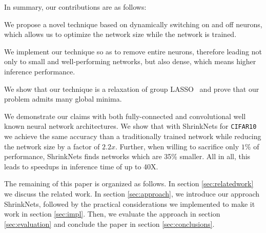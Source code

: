 In summary, our contributions are as follows: 

\begin{compactenum}

\item We propose a novel technique based on dynamically switching on and off neurons, 
which allows us to optimize the network size while the network is trained. 

\item We implement our technique so as to remove entire neurons, therefore
leading not only to small and well-performing networks, but also dense, which
means higher inference performance.


\item We show that our technique is a relaxation of group LASSO~\cite{Yuan2006}
and prove that our problem admits many global minima.

\item We demonstrate our claims with both fully-connected and convolutional well
known neural network architectures. We show that with ShrinkNets for
\texttt{CIFAR10} we achieve the same accuracy than a traditionally trained
network while reducing the network size by a factor of $2.2x$. Further, when
willing to sacrifice only $1$\% of performance, ShrinkNets finds networks which
are 35\% smaller. All in all, this leads to speedups in inference time of up to
40X. 


%
%

\end{compactenum}

The remaining of this paper is organized as follows. In section
\ref{sec:relatedwork} we discuss the related work. In section
\ref{sec:approach}, we introduce our approach ShrinkNets, followed by the
practical considerations we implemented to make it work in section
\ref{sec:impl}. Then, we evaluate the approach in section \ref{sec:evaluation}
and conclude the paper in section \ref{sec:conclusions}.


